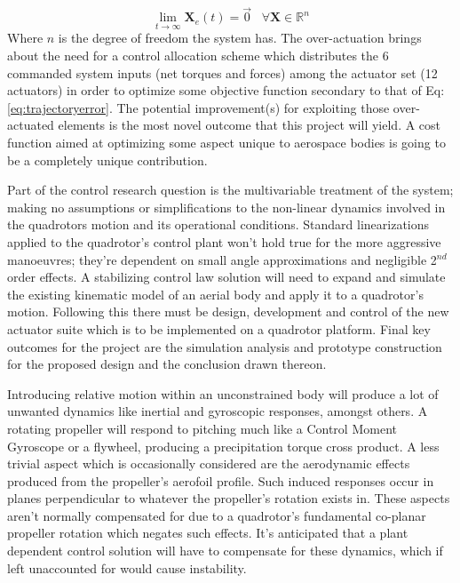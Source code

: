 \begin{equation} \label{eq:trajectoryerror}
\lim_{t \rightarrow \infty} \mathbf{X}_e(t) = \vec{0}\hspace{10pt}\forall \mathbf{X} \in \mathbb{R}^n
\end{equation}
Where $n$ is the degree of freedom the system has. The over-actuation brings about the need for a control allocation scheme which distributes the 6 commanded system inputs (net torques and forces) among the actuator set (12 actuators) in order to optimize some objective function secondary to that of Eq:\ref{eq:trajectoryerror}. The potential improvement(s) for exploiting those over-actuated elements is the most novel outcome that this project will yield. A cost function aimed at optimizing some aspect unique to aerospace bodies is going to be a completely unique contribution.
\par
Part of the control research question is the multivariable treatment of the system; making no assumptions or simplifications to the non-linear dynamics involved in the quadrotors motion and its operational conditions. Standard linearizations applied to the quadrotor's control plant won't hold true for the more aggressive manoeuvres; they're dependent on small angle approximations and negligible 2$^{nd}$ order effects. A stabilizing control law solution will need to expand and simulate the existing kinematic model of an aerial body and apply it to a quadrotor's motion. Following this there must be design, development and control of the new actuator suite which is to be implemented on a quadrotor platform. Final key outcomes for the project are the simulation analysis and prototype construction for the proposed design and the conclusion drawn thereon.
\par
Introducing relative motion within an unconstrained body will produce a lot of unwanted dynamics like inertial and gyroscopic responses, amongst others. A rotating propeller will respond to pitching much like a Control Moment Gyroscope \cite{cmg} or a flywheel, producing a precipitation torque cross product. A less trivial aspect which is occasionally considered are the aerodynamic effects produced from the propeller's aerofoil profile. Such induced responses occur in planes perpendicular to whatever the propeller's rotation exists in. These aspects aren't normally compensated for due to a quadrotor's fundamental co-planar propeller rotation which negates such effects. It's anticipated that a plant dependent control solution will have to compensate for these dynamics, which if left unaccounted for would cause instability.
